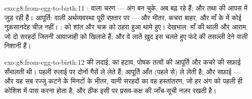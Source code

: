 \begin{solution}{exo:g8:from-egg-to-birth:11}
:  वाला चरण --- अंग बन चुके, अब बढ़ रहे हैं; और
 तथा  की  आपस में जुड़ रही हैं। आपूर्ति:  वाली
अर्थव्यवस्था पूरी रफ़्तार पर ---  और  भीतर, कचरा बाहर,
और माँ के  में कोई नुक़सानदेह चीज़ नहीं। :  को शांत
और चक्र को ठहरा हुआ थामे हुए। देखभाल: माँ की थाली और आराम, जो दो
सरहदों जितनी आवाजाही को खिलाते हैं; और वे लातें ख़ुद इस चलते हुए फंदे की
तसल्ली देने वाली निशानी हैं।
\end{solution}

\begin{solution}{exo:g8:from-egg-to-birth:12}
  की लदाई,  का हटाव, पोषक तत्वों की आपूर्ति
और कचरे की सफ़ाई सँभालती थी। पहली रुलाई पर दोनों गैसें  ले लेते
हैं; आपूर्ति आँत (पहले  से) ले लेती है; और सफ़ाई  --- और यह सब
रज्जु कटने के मिनटों के भीतर, यानी सरहदों का वह हस्तांतरण, जो हर अंग को
पहली ही कोशिश में पास करना होता है, और ठीक इसी पर प्रसव-कक्ष की
जाँच-सूची नज़र रखती है।
\end{solution}

